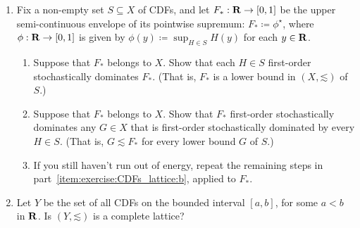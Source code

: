 \begin{exercise}
\begin{enumerate}[label=(\alph*),resume]
\begin{enumerate}[label=(\roman*)]
\begin{itemize}
				\item if $F^*$ does not belong to $X$, then $S$ admits no supremum in $(X,\mathord{\lesssim})$.
			
			\end{itemize}

		\end{enumerate}

		The set $S$ is called \emph{tight} iff for every $\eps>0$, there exist $x<y$ in $\R$ such that $H(y)-H(x) \geq 1-\eps$ for each $H \in S$.%
			\footnote{You may have encountered tightness when studying weak convergence of probability measures, e.g. in proving the central limit theorem \parencite[e.g.][chapter~11]{Rosenthal2006}.}

		\begin{enumerate}[label=(\roman*),resume]

			\item Prove that if $S$ is tight, then $F^*$ belongs to $X$.

			\item Prove by example that if $S$ is not tight, then $F^*$ need not belong to $X$.
		
		\end{enumerate}

		\item \label{item:exercise:CDFs_lattice:c} Fix a non-empty set $S \subseteq X$ of CDFs, and let $F_* : \mathbf{R} \to [0,1]$ be the upper semi-continuous envelope of its pointwise supremum: $F_* \coloneqq \phi^\star$, where $\phi : \mathbf{R} \to [0,1]$ is given by $\phi(y) \coloneqq \sup_{H \in S} H(y)$ for each $y \in \mathbf{R}$.

		\begin{enumerate}[label=(\roman*)]

			\item Suppose that $F_*$ belongs to $X$. Show that each $H \in S$ first-order stochastically dominates $F_*$. (That is, $F_*$ is a lower bound in $(X,\mathord{\lesssim})$ of $S$.)

			\item Suppose that $F_*$ belongs to $X$. Show that $F_*$ first-order stochastically dominates any $G \in X$ that is first-order stochastically dominated by every $H \in S$.
			(That is, $G \lesssim F_*$ for every lower bound $G$ of $S$.)

			\item If you still haven't run out of energy, repeat the remaining steps in part~\ref{item:exercise:CDFs_lattice:b}, applied to $F_*$.
		
		\end{enumerate}

		\item Let $Y$ be the set of all CDFs on the bounded interval $[a,b]$, for some $a<b$ in $\R$. Is $(Y,\mathord{\lesssim})$ is a complete lattice?
	
	\end{enumerate}
\end{exercise}




